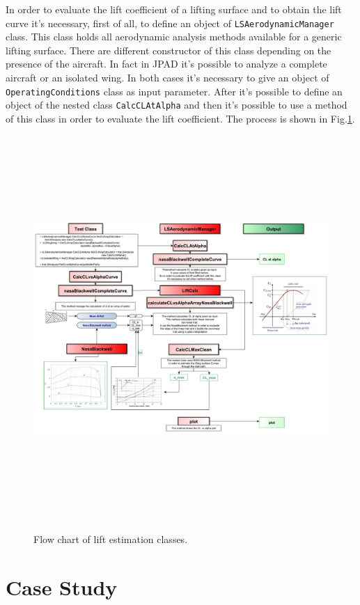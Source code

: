 In order to evaluate the lift coefficient of a lifting surface and to obtain the lift curve it's necessary, first of all, to define an object of \texttt{LSAerodynamicManager} class. This class holds all aerodynamic analysis methods available for a generic lifting surface. There are different constructor of this class depending on the presence of the aircraft. In fact in JPAD it's possible to analyze a complete aircraft or an isolated wing. In both cases it's necessary to give an object of \texttt{OperatingConditions} class as input parameter. After it's possible to define an object of the nested class \texttt{CalcCLAtAlpha} and then it's possible to use a method of this class in order to evaluate the lift coefficient. The process is shown in Fig.\ref{fig:clalf}.

\begin{figure}[H]
\centering
{\includegraphics[height=14.6cm, angle=90]{Immagini/clflowchart.pdf}} 
\caption{Flow chart of lift estimation classes.}
\label{fig:clalf}
\end{figure}


\section{Case Study}

